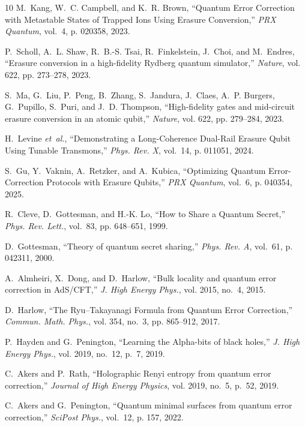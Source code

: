 \documentclass[]{amsart}
\begin{document}
\begin{thebibliography}{10}
M.~Kang, W.~C. Campbell, and K.~R. Brown, ``{Quantum Error Correction with Metastable States of Trapped Ions Using Erasure Conversion},'' \emph{PRX Quantum}, vol.~4, p. 020358, 2023.

P.~Scholl, A.~L. Shaw, R.~B.-S. Tsai, R.~Finkelstein, J.~Choi, and M.~Endres, ``{Erasure conversion in a high-fidelity {R}ydberg quantum simulator},'' \emph{Nature}, vol. 622, pp. 273--278, 2023.

S.~Ma, G.~Liu, P.~Peng, B.~Zhang, S.~Jandura, J.~Claes, A.~P. Burgers, G.~Pupillo, S.~Puri, and J.~D. Thompson, ``{High-fidelity gates and mid-circuit erasure conversion in an atomic qubit},'' \emph{Nature}, vol. 622, pp. 279--284, 2023.

H.~Levine \emph{et~al.}, ``{Demonstrating a Long-Coherence Dual-Rail Erasure Qubit Using Tunable Transmons},'' \emph{Phys. Rev. X}, vol.~14, p. 011051, 2024.

S.~Gu, Y.~Vaknin, A.~Retzker, and A.~Kubica, ``{Optimizing Quantum Error-Correction Protocols with Erasure Qubits},'' \emph{PRX Quantum}, vol.~6, p. 040354, 2025.

R.~Cleve, D.~Gottesman, and H.-K. Lo, ``{How to Share a Quantum Secret},'' \emph{Phys. Rev. Lett.}, vol.~83, pp. 648--651, 1999.

D.~Gottesman, ``{Theory of quantum secret sharing},'' \emph{Phys. Rev. A}, vol.~61, p. 042311, 2000.

A.~Almheiri, X.~Dong, and D.~Harlow, ``{Bulk locality and quantum error correction in {A}d{S}/{CFT}},'' \emph{J. High Energy Phys.}, vol. 2015, no.~4, 2015.

D.~Harlow, ``{The {Ryu--Takayanagi} Formula from Quantum Error Correction},'' \emph{Commun. Math. Phys.}, vol. 354, no.~3, pp. 865--912, 2017.

P.~Hayden and G.~Penington, ``{Learning the Alpha-bits of black holes},'' \emph{J. High Energy Phys.}, vol. 2019, no.~12, p.~7, 2019.

C.~Akers and P.~Rath, ``Holographic {R}enyi entropy from quantum error correction,'' \emph{Journal of High Energy Physics}, vol. 2019, no.~5, p.~52, 2019.

C.~Akers and G.~Penington, ``{Quantum minimal surfaces from quantum error correction},'' \emph{SciPost Phys.}, vol.~12, p. 157, 2022.


\end{thebibliography}
\end{document}
